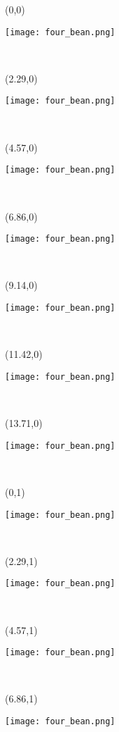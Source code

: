 \documentclass[a4paper]{article}
\newcommand{\myXfourBean}[0]{
\texttt{[image: four\_bean.png]}
}
\newcommand{\mycard}[5]{%
	\tiny #1 #2
	\hspace{-0.75cm} \large#3\\
}
\begin{document}


\begin{textblock}{2.29}(0,0)
\mycard{}{}{
\myXfourBean
}{}{} 
\end{textblock}

\begin{textblock}{2.29}(2.29,0)
\mycard{}{}{
\myXfourBean
}{}{} 
\end{textblock}

\begin{textblock}{2.29}(4.57,0)
\mycard{}{}{
\myXfourBean
}{}{} 
\end{textblock}

\begin{textblock}{2.29}(6.86,0)
\mycard{}{}{
\myXfourBean
}{}{} 
\end{textblock}

\begin{textblock}{2.29}(9.14,0)
\mycard{}{}{
\myXfourBean
}{}{} 
\end{textblock}

\begin{textblock}{2.29}(11.42,0)
\mycard{}{}{
\myXfourBean
}{}{} 
\end{textblock}

\begin{textblock}{2.29}(13.71,0)
\mycard{}{}{
\myXfourBean
}{}{} 
\end{textblock}


\begin{textblock}{2.29}(0,1)
\mycard{}{}{
\myXfourBean
}{}{} 
\end{textblock}

\begin{textblock}{2.29}(2.29,1)
\mycard{}{}{
\myXfourBean
}{}{} 
\end{textblock}

\begin{textblock}{2.29}(4.57,1)
\mycard{}{}{
\myXfourBean
}{}{} 
\end{textblock}

\begin{textblock}{2.29}(6.86,1)
\mycard{}{}{
\myXfourBean
}{}{} 
\end{textblock}
\end{document}
